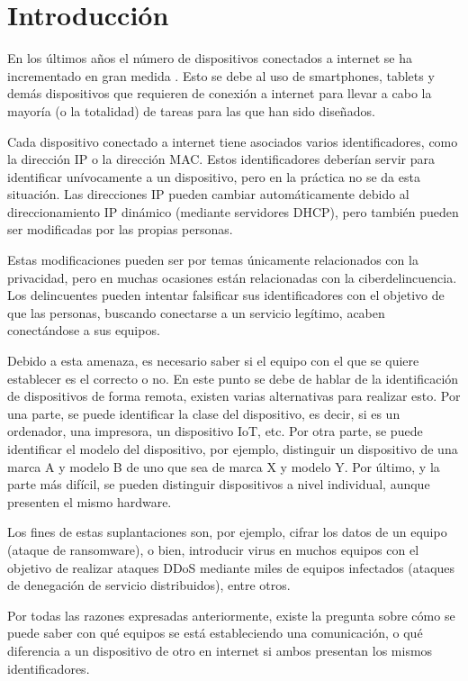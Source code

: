 
\chapter{Introducción} \label{chap:intro}

En los últimos años el número de dispositivos conectados a internet se ha incrementado en gran medida \cite{84Billio53:online}. Esto se debe al uso de smartphones, tablets y demás dispositivos que requieren de conexión a internet para llevar a cabo la mayoría (o la totalidad) de tareas para las que han sido diseñados.

Cada dispositivo conectado a internet tiene asociados varios identificadores, como la dirección IP o la dirección MAC. Estos identificadores deberían servir para identificar unívocamente a un dispositivo, pero en la práctica no se da esta situación. Las direcciones IP pueden cambiar automáticamente debido al direccionamiento IP dinámico (mediante servidores DHCP), pero también pueden ser modificadas por las propias personas. 

Estas modificaciones pueden ser por temas únicamente relacionados con la privacidad, pero en muchas ocasiones están relacionadas con la ciberdelincuencia. Los delincuentes pueden intentar falsificar sus identificadores con el objetivo de que las personas, buscando conectarse a un servicio legítimo, acaben conectándose a sus equipos.

Debido a esta amenaza, es necesario saber si el equipo con el que se quiere establecer es el correcto o no. En este punto se debe de hablar de la identificación de dispositivos de forma remota, existen varias alternativas para realizar esto. Por una parte, se puede identificar la clase del dispositivo, es decir, si es un ordenador, una impresora, un dispositivo IoT, etc. Por otra parte, se puede identificar el modelo del dispositivo, por ejemplo, distinguir un dispositivo de una marca A y modelo B de uno que sea de marca X y modelo Y. Por último, y la parte más difícil, se pueden distinguir dispositivos a nivel individual, aunque presenten el mismo hardware.

Los fines de estas suplantaciones son, por ejemplo, cifrar los datos de un equipo (ataque de ransomware), o bien, introducir virus en muchos equipos con el objetivo de realizar ataques DDoS mediante miles de equipos infectados (ataques de denegación de servicio distribuidos), entre otros.

Por todas las razones expresadas anteriormente, existe la pregunta sobre cómo se puede saber con qué equipos se está estableciendo una comunicación, o qué diferencia a un dispositivo de otro en internet si ambos presentan los mismos identificadores.

